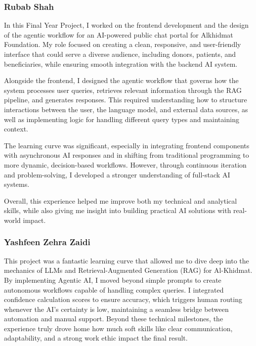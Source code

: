 \vspace{1em}
\subsubsection*{Rubab Shah}

In this Final Year Project, I worked on the frontend development and the design of the agentic workflow for an AI-powered public chat portal for Alkhidmat Foundation. My role focused on creating a clean, responsive, and user-friendly interface that could serve a diverse audience, including donors, patients, and beneficiaries, while ensuring smooth integration with the backend AI system.

Alongside the frontend, I designed the agentic workflow that governs how the system processes user queries, retrieves relevant information through the RAG pipeline, and generates responses. This required understanding how to structure interactions between the user, the language model, and external data sources, as well as implementing logic for handling different query types and maintaining context.

The learning curve was significant, especially in integrating frontend components with asynchronous AI responses and in shifting from traditional programming to more dynamic, decision-based workflows. However, through continuous iteration and problem-solving, I developed a stronger understanding of full-stack AI systems.

Overall, this experience helped me improve both my technical and analytical skills, while also giving me insight into building practical AI solutions with real-world impact.

\vspace{1em}
\subsubsection*{Yashfeen Zehra Zaidi}

This project was a fantastic learning curve that allowed me to dive deep into the mechanics 
of LLMs and Retrieval-Augmented Generation (RAG) for Al-Khidmat. By implementing Agentic AI, 
I moved beyond simple prompts to create autonomous workflows capable of handling complex 
queries. I integrated confidence calculation scores to ensure accuracy, which triggers 
human routing whenever the AI’s certainty is low, maintaining a seamless bridge between 
automation and manual support. Beyond these technical milestones, the experience truly 
drove home how much soft skills like clear communication, adaptability, and a strong work 
ethic impact the final result.

